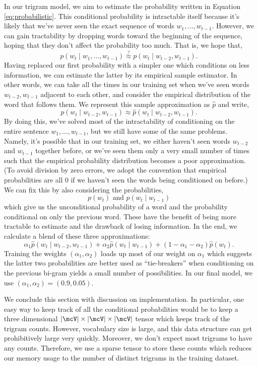 \documentclass[12pt]{article}
\begin{document}
In our trigram model, we aim to estimate the probability written in Equation
\ref{eq:probabilistic}. This conditional probability is intractable itself
because it's likely that we've never seen the exact sequence of words $w_1,
\ldots, w_{t-1}$. However, we can gain tractability by dropping words toward the
beginning of the sequence, hoping that they don't affect the probability too
much. That is, we hope that,
\[ p(w_t \mid w_1, \ldots, w_{t-1}) \stackrel{?}{\approx} p(w_t \mid w_{t-2},
w_{t-1}).\]
Having replaced our first probability with a simpler one which conditions on
less information, we can estimate the latter by its empirical sample estimator.
In other words, we can take all the times in our training set when we've seen
words $w_{t-2}, w_{t-1}$ adjacent to each other, and consider the empirical
distribution of the word that follows them. We represent this sample
approximation as $\hat{p}$ and write,
\[ p (w_t \mid w_{t-2}, w_{t-1}) \approx \hat{p} (w_t \mid w_{t-2}, w_{t-1}).\]
By doing this, we've solved most of the intractability of conditioning on the
entire sentence $w_1, \ldots, w_{t-1}$, but we still have some of the same
problems. Namely, it's possible that in our training set, we either haven't seen
words $w_{t-2}$ and $w_{t-1}$ together before, or we've seen them only a very
small number of times such that the empirical probability distribution becomes a
poor approximation. (To avoid division by zero errors, we adopt the convention
that empirical probabilities are all 0 if we haven't seen the words being
conditioned on before.) We can fix this by also considering the probabilities,
\[ p(w_t) \text{ and } p(w_t \mid w_{t-1})\]
which give us the unconditional probability of a word and the probability
conditional on only the previous word. These have the benefit of being more
tractable to estimate and the drawback of losing information. In the end, we
calculate a blend of these three approximations:
\[ \alpha_1 \hat{p}(w_t \mid w_{t-2}, w_{t-1}) + \alpha_2
\hat{p}(w_t \mid w_{t-1}) + (1-\alpha_1-\alpha_2)\hat{p}(w_t).\]
Training the weights $(\alpha_1, \alpha_2)$ loads up most of our weight on
$\alpha_1$ which suggests the latter two probabilities are better used as
``tie-breakers'' when conditioning on the previous bi-gram yields a small number
of possibilities. In our final model, we use $(\alpha_1, \alpha_2) = (0.9,
0.05)$.

We conclude this section with discussion on implementation. In particular, one
easy way to keep track of all the conditional probabilities would be to keep a
three dimensional $|\mcV| \times |\mcV| \times |\mcV|$ tensor which keeps track
of the trigram counts. However, vocabulary size is large, and this data
structure can get prohibitively large very quickly. Moreover, we don't expect
most trigrams to have any counts. Therefore, we use a sparse tensor to store
these counts which reduces our memory usage to the number of distinct trigrams
in the training dataset.
\end{document}
